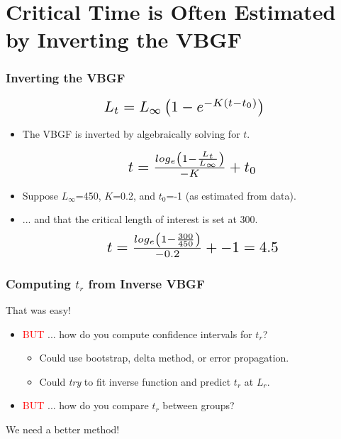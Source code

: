 \documentclass[xcolor=dvipsnames,t]{beamer}\usepackage[]{graphicx}\usepackage[]{color}
\newcommand*{\Scale}[2][4]{\scalebox{#1}{\ensuremath{#2}}}%
\begin{document}
\section{Critical Time is Often Estimated by Inverting the VBGF}

\begin{frame}[fragile]
\frametitle{Inverting the VBGF}

\[\Scale[1.5]{ L_{t} = L_{\infty}\left(1-e^{-K(t-t_{0})}\right) }\]

\pause
\bigskip
\begin{itemize}
  \item The VBGF is inverted by algebraically solving for $t$.
  \smallskip

\[\Scale[1.5]{ t = \frac{log_{e}\left(1-\frac{L_{t}}{L_{\infty}}\right)}{-K} + t_{0} }\]

  \pause
  \bigskip
  \item Suppose $L_{\infty}$=450, $K$=0.2, and $t_{0}$=-1 (as estimated from data).
  \item ... and that the critical length of interest is set at 300.
  \pause
  \bigskip
\[\Scale[1.5]{ t = \frac{log_{e}\left(1-\frac{300}{450}\right)}{-0.2} + -1 = 4.5}\]
\end{itemize}
\end{frame}


\begin{frame}[fragile]
\frametitle{Computing $t_{r}$ from Inverse VBGF}
\begin{center}
{\LARGE That was easy!}
\end{center}
\pause
\vspace{0.25in}
\begin{itemize}
  \item \textcolor{red}{BUT} ... how do you compute confidence intervals for $t_{r}$?
  \begin{itemize}
    \item Could use bootstrap, delta method, or error propagation.
    \item Could \emph{try} to fit inverse function and predict $t_{r}$ at $L_{r}$.
  \end{itemize}
  \pause
  \bigskip
  \item \textcolor{red}{BUT} ... how do you compare $t_{r}$ between groups?
\end{itemize}
\pause
\vspace{0.35in}
\begin{center}
{\LARGE We need a better method!}
\end{center}
\end{frame}
\end{document}
